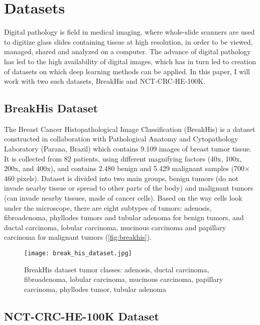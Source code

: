 \section{Datasets}
Digital pathology is field in medical imaging, where whole-slide scanners are used to digitize glass slides containing tissue at high resolution, in order to be viewed, managed, shared and analyzed on a computer. The advance of digital pathology has led to the high availability of digital images, which has in turn led to creation of datasets on which deep learning methods can be applied. In this paper, I will work with two such datasets, BreakHis and NCT-CRC-HE-100K.

\subsection{BreakHis Dataset}

The Breast Cancer Histopathological Image Classification \cite{breakhis_article} (BreakHis) is a dataset constructed in collaboration with Pathological Anatomy and Cytopathology Laboratory (Parana, Brazil) which contains 9.109 images of breast tumor tissue. It is collected from 82 patients, using different magnifying factors (40x, 100x, 200x, and 400x), and contains 2.480  benign and 5.429 malignant samples (700$\times$460 pixels). Dataset is divided into two main groups, benign tumors (do not invade nearby tissue or spread to other parts of the body) and malignant tumors (can invade nearby tissues, made of cancer cells). Based on the way cells look under the microscope, there are eight subtypes of tumors: adenosis, fibroadenoma, phyllodes tumors and tubular adenoma for benign tumors, and ductal carcinoma, lobular carcinoma, mucinous carcinoma and papillary carcinoma for malignant tumors (\textcolor{red}{\autoref{fig:breakhis}}).

\captionsetup[figure]{font=scriptsize,labelfont=scriptsize}

\begin{figure}[h]
	\centering
	\texttt{[image: break\_his\_dataset.jpg]}
	\caption{BreakHis dataset tumor classes: adenosis, ductal carcinoma, fibroadenoma, lobular carcinoma, mucinous carcinoma, papillary carcinoma, phyllodes tumor, tubular adenoma}
	\label{fig:breakhis}
\end{figure}

\subsection{NCT-CRC-HE-100K Dataset}

